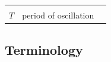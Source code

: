 \documentclass[
]{book}
\begin{document}
\begin{longtable}[]{@{}lll@{}}
\begin{minipage}[t]{0.10\columnwidth}
\strut
\end{minipage}\tabularnewline
\begin{minipage}[t]{0.14\columnwidth}\raggedright
\(T\)\strut
\end{minipage} & \begin{minipage}[t]{0.68\columnwidth}\raggedright
period of oscillation\strut
\end{minipage} & \begin{minipage}[t]{0.10\columnwidth}\raggedright
\strut
\end{minipage}\tabularnewline
\bottomrule
\end{longtable}

\hypertarget{terminology}{%
\subsection*{Terminology}\label{terminology}}
\end{document}
